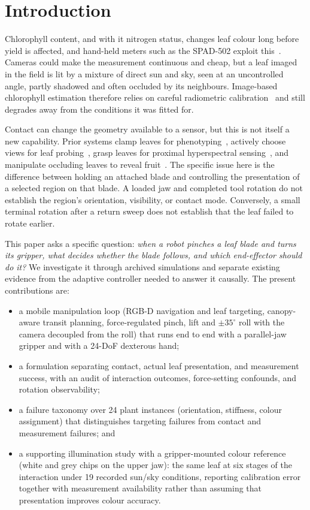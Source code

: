 \documentclass[letterpaper, 10 pt, conference]{ieeeconf}
\begin{document}
\section{Introduction}

Chlorophyll content, and with it nitrogen status, changes leaf colour long before yield is
affected, and hand-held meters such as the SPAD-502 exploit this~\cite{markwell1995}.
Cameras could make the measurement continuous and cheap, but a leaf imaged in the field is
lit by a mixture of direct sun and sky, seen at an uncontrolled angle, partly shadowed and
often occluded by its neighbours. Image-based chlorophyll estimation therefore relies on
careful radiometric calibration~\cite{wang2014} and still degrades away from the
conditions it was fitted for.

Contact can change the geometry available to a sensor, but this is not itself a new
capability. Prior systems clamp leaves for phenotyping~\cite{atefi2019}, actively choose
views for leaf probing~\cite{foix2018}, grasp leaves for proximal hyperspectral
sensing~\cite{mortazavi2026}, and manipulate occluding leaves to reveal
fruit~\cite{yao2025}. The specific issue here is the difference between holding an
attached blade and controlling the presentation of a selected region on that blade.
A loaded jaw and completed tool rotation do not establish the region's orientation,
visibility, or contact mode. Conversely, a small terminal rotation after a return sweep
does not establish that the leaf failed to rotate earlier.

This paper asks a specific question: \emph{when a robot pinches a leaf blade and turns its
gripper, what decides whether the blade follows, and which end-effector should do it?} We
investigate it through archived simulations and separate existing evidence from the
adaptive controller needed to answer it causally. The present contributions are:
\begin{itemize}
\item a mobile manipulation loop (RGB-D navigation and leaf targeting, canopy-aware transit
planning, force-regulated pinch, lift and $\pm35^\circ$ roll with the camera decoupled from
the roll) that runs end to end with a parallel-jaw gripper and with a 24-DoF dexterous hand;
\item a formulation separating contact, actual leaf presentation, and measurement success,
with an audit of interaction outcomes, force-setting confounds, and rotation observability;
\item a failure taxonomy over 24 plant instances (orientation, stiffness, colour
assignment) that distinguishes targeting failures from contact and measurement failures;
and
\item a supporting illumination study with a gripper-mounted colour reference (white and
grey chips on the upper jaw): the same leaf at six stages of the interaction under 19 recorded sun/sky
conditions, reporting calibration error together with measurement availability rather than
assuming that presentation improves colour accuracy.
\end{itemize}
\end{document}
